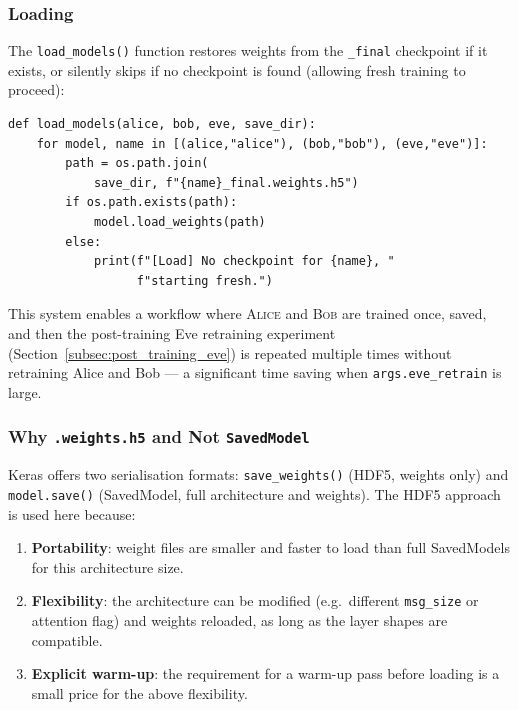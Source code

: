 \documentclass[12pt, a4paper]{article}
\newcommand{\alice}{\textsc{Alice}}
\newcommand{\bob}{\textsc{Bob}}
\newcommand{\code}[1]{\texttt{\color{CodeRed}#1}}
\begin{document}
\subsubsection*{Loading}

The \code{load\_models()} function restores weights from the
\code{\_final} checkpoint if it exists, or silently skips if no
checkpoint is found (allowing fresh training to proceed):

\begin{lstlisting}[caption={Model loading in \code{load\_models()}}]
def load_models(alice, bob, eve, save_dir):
    for model, name in [(alice,"alice"), (bob,"bob"), (eve,"eve")]:
        path = os.path.join(
            save_dir, f"{name}_final.weights.h5")
        if os.path.exists(path):
            model.load_weights(path)
        else:
            print(f"[Load] No checkpoint for {name}, "
                  f"starting fresh.")
\end{lstlisting}

This system enables a workflow where \alice{} and \bob{} are trained
once, saved, and then the post-training Eve retraining experiment
(Section~\ref{subsec:post_training_eve}) is repeated multiple times without retraining Alice and
Bob --- a significant time saving when \code{args.eve\_retrain} is
large.

\subsubsection*{Why \texttt{.weights.h5} and Not \texttt{SavedModel}}

Keras offers two serialisation formats: \code{save\_weights()} (HDF5,
weights only) and \code{model.save()} (SavedModel, full architecture
and weights). The HDF5 approach is used here because:

\begin{enumerate}[leftmargin=2em, itemsep=3pt]
  \item \textbf{Portability}: weight files are smaller and faster to
        load than full SavedModels for this architecture size.
  \item \textbf{Flexibility}: the architecture can be modified
        (e.g.\ different \code{msg\_size} or attention flag) and weights
        reloaded, as long as the layer shapes are compatible.
  \item \textbf{Explicit warm-up}: the requirement for a warm-up
        pass before loading is a small price for the above flexibility.
\end{enumerate}
\end{document}
